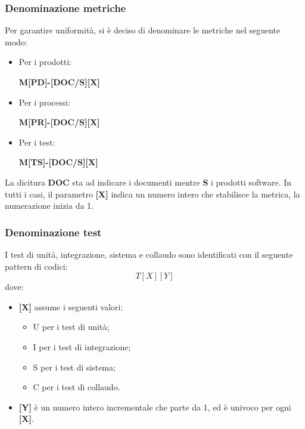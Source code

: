 \subsubsection{Denominazione metriche}
Per garantire uniformità, si è deciso di denominare le metriche nel seguente modo:
\begin{itemize}
    \item Per i prodotti:
          \begin{center}
              \textbf{M[PD]-[DOC/S][X]}
          \end{center}
    \item Per i processi:
          \begin{center}
              \textbf{M[PR]-[DOC/S][X]}
          \end{center}
    \item Per i test:
          \begin{center}
              \textbf{M[TS]-[DOC/S][X]}
          \end{center}
\end{itemize}
La dicitura \textbf{DOC} sta ad indicare i documenti mentre \textbf{S} i prodotti software.
In tutti i casi, il parametro \textbf{[X]} indica un numero intero che stabilisce la metrica, la numerazione inizia da 1.

\subsubsection{Denominazione test}
\label{_denominazioneTest}
I test di unità, integrazione, sistema e collaudo sono identificati con il seguente pattern di codici:
\[
    T[X][Y]    
\]
dove:
\begin{itemize}
    \item \textbf{[X]} assume i seguenti valori:
    \begin{itemize}
        \item U per i test di unità;
        \item I per i test di integrazione;
        \item S per i test di sistema;
        \item C per i test di collaudo.
    \end{itemize}
    \item \textbf{[Y]} è un numero intero incrementale che parte da 1, ed è univoco per ogni \textbf{[X]}.
\end{itemize}

